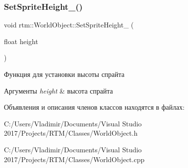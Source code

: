 \subsubsection{\texorpdfstring{Set\+Sprite\+Height\+\_\+()}{SetSpriteHeight\_()}}
{\footnotesize\ttfamily void rtm\+::\+World\+Object\+::\+Set\+Sprite\+Height\+\_\+ (\begin{DoxyParamCaption}\item[{float}]{height }\end{DoxyParamCaption})\hspace{0.3cm}{\ttfamily [private]}}



Функция для установки высоты спрайта 


\begin{DoxyParams}{Аргументы}
{\em height} & высота спрайта \\
\hline
\end{DoxyParams}


Объявления и описания членов классов находятся в файлах\+:\begin{DoxyCompactItemize}
\item 
C\+:/\+Users/\+Vladimir/\+Documents/\+Visual Studio 2017/\+Projects/\+R\+T\+M/\+Classes/World\+Object.\+h\item 
C\+:/\+Users/\+Vladimir/\+Documents/\+Visual Studio 2017/\+Projects/\+R\+T\+M/\+Classes/World\+Object.\+cpp\end{DoxyCompactItemize}
